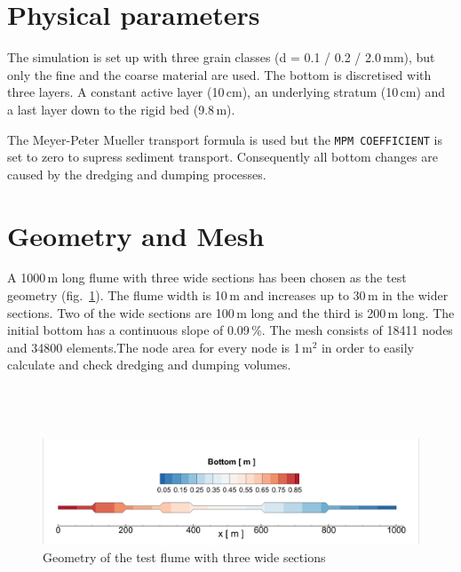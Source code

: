 \section{Physical parameters}
%
The simulation is set up with three grain classes (d = 0.1 / 0.2 / 2.0\,mm), but only the fine and the coarse material
are used. The bottom is discretised with three layers. A constant active layer (10\,cm), an underlying stratum (10\,cm)
and a last layer down to the rigid bed (9.8\,m).

The Meyer-Peter Mueller transport formula is used but the \texttt{MPM COEFFICIENT} is set to zero to supress sediment transport.
Consequently all bottom changes are caused by the dredging and dumping processes.

\section{Geometry and Mesh}
%
A 1000\,m long flume with three wide sections has been chosen as the test geometry (fig.~\ref{E1iniBot}).
The flume width is 10\,m and increases up to 30\,m in the wider sections.
Two of the wide sections are 100\,m long and the third is 200\,m long.
The initial bottom has a continuous slope of 0.09\,\%.
The mesh consists of 18411 nodes and 34800 elements.The node area for every node is 1\,m$^2$ in
order to easily calculate and check dredging and dumping volumes.\\
\\
\\
\\
\begin{figure} [!h]
\centering
 \includegraphics[scale=0.175]{img/ini_bottom.png}
 \caption{Geometry of the test flume with three wide sections}\label{E1iniBot}
\end{figure}



